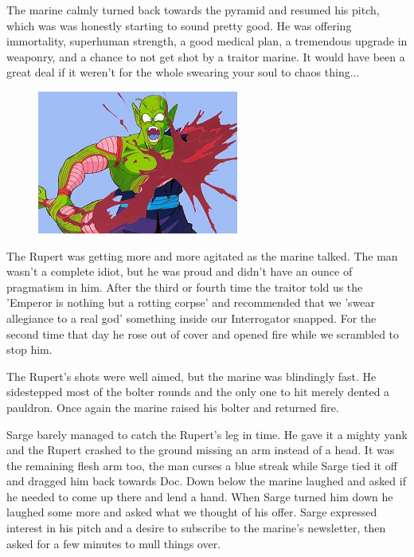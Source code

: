 The marine calmly turned back towards the pyramid and resumed his pitch, which was was honestly starting to sound pretty good. 
He was offering immortality, superhuman strength, a good medical plan, a tremendous upgrade in weaponry, and a chance to not get shot by a traitor marine. 
It would have been a great deal if it weren't for the whole swearing your soul to chaos thing...

\begin{figure}
	\begin{center}
		\includegraphics[width=\figwidth]{pics/6/47.png}
	\end{center}
\end{figure}
The Rupert was getting more and more agitated as the marine talked. 
The man wasn't a complete idiot, but he was proud and didn't have an ounce of pragmatism in him. 
After the third or fourth time the traitor told us the 'Emperor is nothing but a rotting corpse' and recommended that we 'swear allegiance to a real god' something inside our Interrogator snapped. 
For the second time that day he rose out of cover and opened fire while we scrambled to stop him.

The Rupert's shots were well aimed, but the marine was blindingly fast. 
He sidestepped most of the bolter rounds and the only one to hit merely dented a pauldron. 
Once again the marine raised his bolter and returned fire.

Sarge barely managed to catch the Rupert's leg in time. 
He gave it a mighty yank and the Rupert crashed to the ground missing an arm instead of a head. 
It was the remaining flesh arm too, the man curses a blue streak while Sarge tied it off and dragged him back towards Doc. 
Down below the marine laughed and asked if he needed to come up there and lend a hand. 
When Sarge turned him down he laughed some more and asked what we thought of his offer. 
Sarge expressed interest in his pitch and a desire to subscribe to the marine's newsletter, then asked for a few minutes to mull things over.

